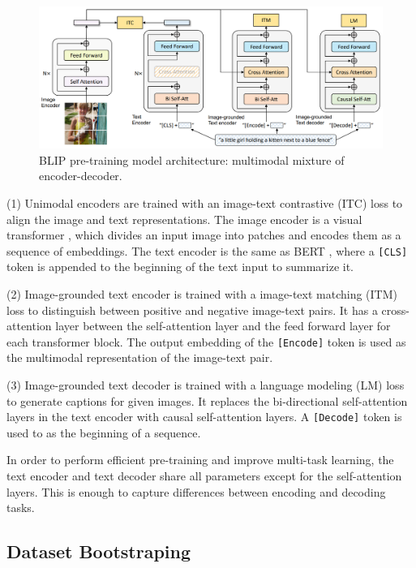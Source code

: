 \documentclass[11pt]{article}
\begin{document}
\begin{figure}[ht]
    \centering
    \includegraphics[width=\linewidth]{blip_pretraining.png}
    \caption{BLIP pre-training model architecture: multimodal mixture
of encoder-decoder.}
    \label{fig:blip_pretraining}
\end{figure}

(1) Unimodal encoders are trained with an image-text contrastive (ITC) loss to align the image and text representations. The image encoder is a visual transformer \cite{dosovitskiy2020image}, which divides an input image into patches and encodes them as a sequence of embeddings. The text encoder is the same as BERT \cite{devlin2018bert}, where a \texttt{[CLS]} token is appended to the beginning of the text input to summarize it.

(2) Image-grounded text encoder is trained with a image-text matching (ITM) loss to distinguish between positive and negative image-text pairs. It has a cross-attention layer between the self-attention layer and the feed forward layer for each transformer block. The output embedding of the \texttt{[Encode]} token is used as the multimodal representation of the image-text pair.

(3) Image-grounded text decoder is trained with a language modeling (LM) loss to generate captions for given images. It replaces the bi-directional self-attention layers in the text encoder with causal self-attention layers. A \texttt{[Decode]} token is used to as the beginning of a sequence.

In order to perform efficient pre-training and improve multi-task learning, the text encoder and text decoder share all parameters except for the self-attention layers. This is enough to capture differences between encoding and decoding tasks.

\subsection{Dataset Bootstraping}
\end{document}
